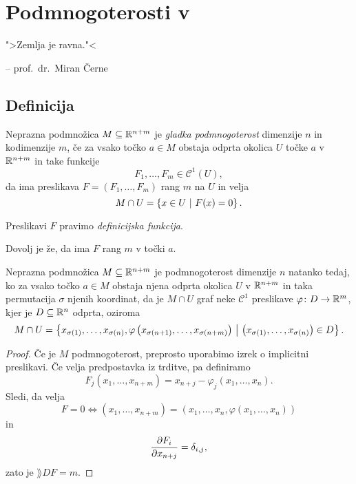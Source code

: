 \section{Podmnogoterosti v }

\epigraph{">Zemlja je ravna."<}{-- prof.~dr.~Miran Černe}

\subsection{Definicija}


\begin{definicija}
Neprazna podmnožica $M \subseteq \mathbb{R}^{n+m}$ je
\emph{gladka podmnogoterost} dimenzije $n$ in
kodimenzije $m$, če za vsako točko $a \in M$ obstaja odprta okolica
$U$ točke $a$ v $\mathbb{R}^{n+m}$ in take funkcije
\[
F_1, \dots, F_m \in \mathcal{C}^1(U),
\]
da ima preslikava $F = (F_1, \dots, F_m)$ rang $m$ na $U$ in velja
\[
M \cap U = \left\{x \in U~\middle\vert~F(x) = 0\right\}.
\]
\end{definicija}

\begin{opomba}
Preslikavi $F$ pravimo
\emph{definicijska funkcija}.
\end{opomba}

\begin{opomba}
Dovolj je že, da ima $F$ rang $m$ v točki $a$.
\end{opomba}

\begin{trditev}
Neprazna podmnožica $M \subseteq \mathbb{R}^{n+m}$ je podmnogoterost
dimenzije $n$ natanko tedaj, ko za vsako točko $a \in M$ obstaja
njena odprta okolica $U$ v $\mathbb{R}^{n+m}$ in taka permutacija $\sigma$
njenih koordinat, da je $M \cap U$ graf neke $\mathcal{C}^1$
preslikave $\varphi \colon D \to \mathbb{R}^m$, kjer je $D \subseteq \mathbb{R}^n$
odprta, oziroma
\[
M \cap U = \left\{x_{\sigma(1)}, \dots, x_{\sigma(n)},
\varphi\left(x_{\sigma(n+1)}, \dots, x_{\sigma(n+m)}\right)~\middle\vert~\left(x_{\sigma(1)}, \dots, x_{\sigma(n)}\right) \in D\right\}.
\]
\end{trditev}

\begin{proof}
Če je $M$ podmnogoterost, preprosto uporabimo izrek o implicitni
preslikavi. Če velja predpostavka iz trditve, pa definiramo
\[
F_j(x_1, \dots, x_{n+m}) = x_{n+j} - \varphi_j(x_1, \dots, x_n).
\]
Sledi, da velja
\[
F = 0 \iff (x_1, \dots, x_{n+m}) =
(x_1, \dots, x_n, \varphi(x_1, \dots, x_n))
\]
in
\[
\frac{\partial F_i}{\partial x_{n+j}} = \delta_{i,j},
\]
zato je $\rang DF = m$.
\end{proof}

